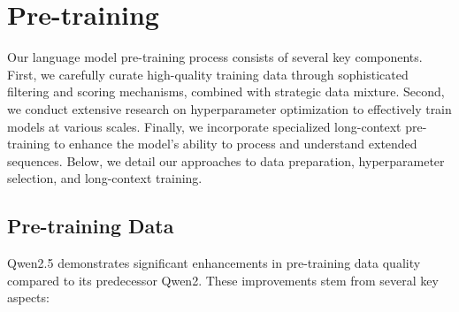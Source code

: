 \section{Pre-training}

Our language model pre-training process consists of several key components. First, we carefully curate high-quality training data through sophisticated filtering and scoring mechanisms, combined with strategic data mixture. Second, we conduct extensive research on hyperparameter optimization to effectively train models at various scales. Finally, we incorporate specialized long-context pre-training to enhance the model's ability to process and understand extended sequences. Below, we detail our approaches to data preparation, hyperparameter selection, and long-context training.

\label{sec:pre}

\subsection{Pre-training Data}

Qwen2.5 demonstrates significant enhancements in pre-training data quality compared to its predecessor Qwen2. These improvements stem from several key aspects:

